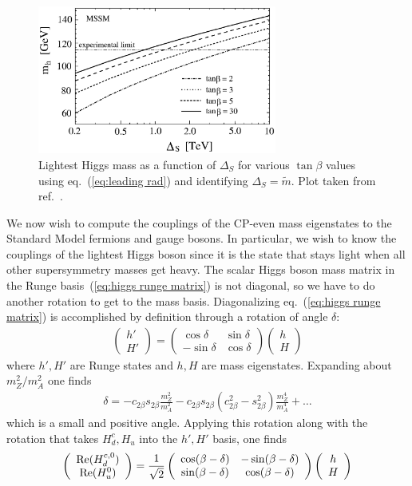 \documentclass[12pt]{article}
\def\beq{\begin{eqnarray}}
\def\eeq{\end{eqnarray}}
\def\eq#1{eq.~(\ref{#1})}
\def\vector#1#2{\left( \begin{array}{c}#1\\ #2\end{array}\right)}
\begin{document}
\begin{figure}[t]
\begin{center}
\includegraphics[width=0.7\textwidth]{MSSM}
\vspace{0.3cm}
\caption{Lightest Higgs mass as a function of $\Delta_S$ for various $\tan\beta$ values using \eq{eq:leading rad} and identifying $\Delta_S=\tilde m$. Plot taken from ref.~\cite{Tobe:2002zj}.
\label{fig:higgs mass}}
\end{center}
\end{figure}

We now wish to compute the couplings of the CP-even mass eigenstates to the Standard Model fermions and gauge bosons.  In particular, we wish to know the couplings of the lightest Higgs boson since it is the state that stays light when all other supersymmetry masses get heavy.  The scalar Higgs boson mass matrix in the Runge basis~(\ref{eq:higgs runge matrix}) is not diagonal, so we have to do another rotation to get to the mass basis. Diagonalizing \eq{eq:higgs runge matrix} is accomplished by definition through a rotation of angle $\delta$:
\beq
\vector{h'}{H'}=\left(\begin{array}{cc}
\cos\delta & \sin\delta \\ -\sin\delta & \cos\delta \end{array}\right)
\vector{h}{H}
\eeq
where $h',H'$ are Runge states  and $h,H$ are mass eigenstates.
Expanding about $m_Z^2/m_A^2$ one finds
\beq
\delta = -c_{2\beta}s_{2\beta}\frac{m_Z^2}{m_A^2}-c_{2\beta}s_{2\beta}(c^2_{2\beta}-s^2_{2\beta})\frac{m_Z^4}{m_A^4}+\ldots
\label{eq:small delta}
\eeq
which is a small and positive angle.
Applying this rotation along with the rotation that takes $H^c_d,H_u$ into the $h',H'$ basis, one finds
\beq
\vector{{\rm Re}(H_d^{c,0})}{{\rm Re}(H^0_u)}=\frac{1}{\sqrt{2}}\left( \begin{array}{cc}
\cos(\beta-\delta) & -\sin(\beta-\delta) \\ \sin(\beta-\delta) & \cos(\beta-\delta) \end{array}\right)
\vector{h}{H}
\eeq
\end{document}
